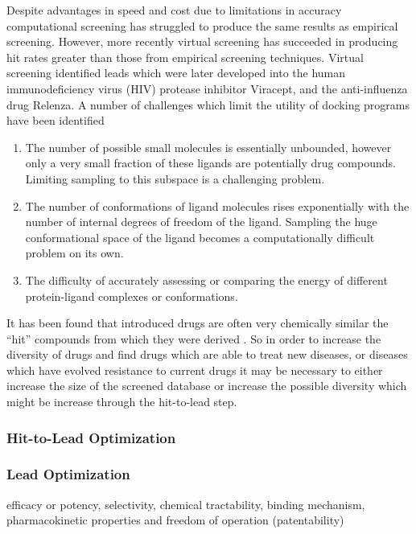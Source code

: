 Despite advantages in speed and cost due to limitations in accuracy computational screening has struggled to produce the same results as empirical screening.
However, more recently virtual screening has succeeded in producing hit rates greater than those from empirical screening techniques.
Virtual screening identified leads which were later developed into the human immunodeficiency virus (HIV) protease inhibitor Viracept, and the anti-influenza drug Relenza.
A number of challenges which limit the utility of docking programs have been identified
\begin{enumerate}
\item The number of possible small molecules is essentially unbounded, however only a very small fraction of these ligands are potentially drug compounds. Limiting sampling to this subspace is a challenging problem.
\item The number of conformations of ligand molecules rises exponentially with the number of internal degrees of freedom of the ligand. Sampling the huge conformational space of the ligand becomes a computationally difficult problem on its own.
\item The difficulty of accurately assessing or comparing the energy of different protein-ligand complexes or conformations\cite{shoichet2004virtual}.
\end{enumerate}

It has been found that introduced drugs are often very chemically similar the ``hit'' compounds from which they were derived \cite{proudfoot2002drugs}.
So in order to increase the diversity of drugs and find drugs which are able to treat new diseases, or diseases which have evolved resistance to current drugs it may be necessary to either increase the size of the screened database or increase the possible diversity which might be increase through the hit-to-lead step.


\subsubsection{Hit-to-Lead Optimization}
\label{subsubsection:hit_to_lead}


\subsubsection{Lead Optimization}
\label{subsubsection:lead_optimization}

efficacy or potency, selectivity, chemical tractability, binding mechanism, pharmacokinetic properties and freedom of operation (patentability) \cite{keserHu2006hit}
